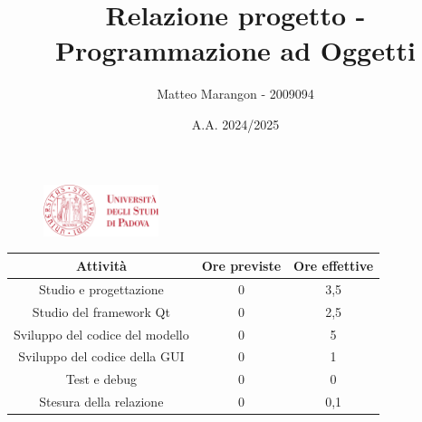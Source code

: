 \documentclass[10pt]{article}
\title{Relazione progetto - Programmazione ad Oggetti}
\author{Matteo Marangon - 2009094}
\date{A.A. 2024/2025}
\begin{document}
\begin{figure}
    \centering
    \includegraphics[width=0.3\textwidth]{./unipdlogo.png}
\end{figure}
\maketitle

\newpage

\tableofcontents
\newpage

\begin{center}
    \begin{tabular}{| c | c | c |} \hline
    Attività & Ore previste & Ore effettive \\\hline
    Studio e progettazione & 0 & 3,5 \\
    Studio del framework Qt & 0 & 2,5 \\
    Sviluppo del codice del modello & 0 & 5 \\
    Sviluppo del codice della GUI & 0 & 1 \\
    Test e debug & 0 & 0 \\
    Stesura della relazione & 0 & 0,1 \\\hline
    \end{tabular}
\end{center}
\end{document}
